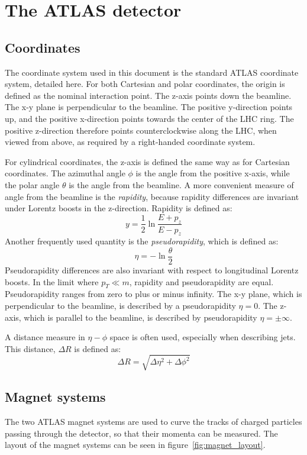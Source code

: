 \section{The ATLAS detector}\label{sec:atlas_detector}
\subsection{Coordinates}\label{subsec:coordinates}
The coordinate system used in this document is the standard ATLAS coordinate system, detailed here.
For both Cartesian and polar coordinates, the origin is defined as the nominal interaction point.
The z-axis points down the beamline.
The x-y plane is perpendicular to the beamline.
The positive y-direction points up, and the positive x-direction points towards the center of the LHC ring.
The positive z-direction therefore points counterclockwise along the LHC, when viewed from above, as required by a right-handed coordinate system.

For cylindrical coordinates, the z-axis is defined the same way as for Cartesian coordinates.
The azimuthal angle $\phi$ is the angle from the positive x-axis, while the polar angle $\theta$ is the angle from the beamline.
A more convenient measure of angle from the beamline is the \textit{rapidity}, because rapidity differences are invariant under Lorentz boosts in the z-direction.
Rapidity is defined as:
\begin{equation}
y = \frac{1}{2}\ln\frac{E+p_z}{E-p_z}
\end{equation}
Another frequently used quantity is the
\textit{pseudorapidity}, which is defined as:
\begin{equation}
\eta = -\ln\frac{\theta}{2}
\end{equation}
Pseudorapidity differences are also invariant with respect to longitudinal Lorentz boosts.
In the limit where $p_T \ll m$, rapidity and pseudorapidity are equal.
Pseudorapidity ranges from zero to plus or minus infinity.
The x-y plane, which is perpendicular to the beamline, is described by a pseudorapidity $\eta=0$.
The z-axis, which is parallel to the beamline, is described by pseudorapidity $\eta=\pm\infty$.

A distance measure in $\eta-\phi$ space is often used, especially when describing jets.
This distance, $\Delta R$ is defined as:
\begin{equation}
\Delta R = \sqrt{\Delta\eta^2+\Delta\phi^2}
\end{equation}

\subsection{Magnet systems}\label{subsec:magnet_systems}
The two ATLAS magnet systems are used to curve the tracks of charged particles passing through the detector,
so that their momenta can be measured. The layout of the magnet systems can be seen in figure~\ref{fig:magnet_layout}.

